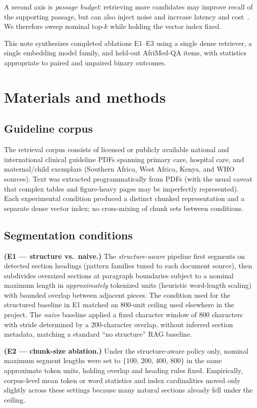 \documentclass[11pt,a4paper]{article}
\begin{document}
A second axis is \emph{passage budget}: retrieving more candidates may improve recall of the supporting passage, but can also inject noise and increase latency and cost~\cite{longcontextplaceholder}. We therefore sweep nominal top-\(k\) while holding the vector index fixed.

This note synthesizes completed ablations E1--E3 using a single dense retriever, a single embedding model family, and held-out AfriMed-QA items, with statistics appropriate to paired and unpaired binary outcomes.

\section{Materials and methods}

\subsection{Guideline corpus}
The retrieval corpus consists of licensed or publicly available national and international clinical guideline PDFs spanning primary care, hospital care, and maternal/child exemplars (Southern Africa, West Africa, Kenya, and WHO sources). Text was extracted programmatically from PDFs (with the usual caveat that complex tables and figure-heavy pages may be imperfectly represented). Each experimental condition produced a distinct chunked representation and a separate dense vector index; no cross-mixing of chunk sets between conditions.

\subsection{Segmentation conditions}
\textbf{(E1 --- structure vs.\ naive.)} The \emph{structure-aware} pipeline first segments on detected section headings (pattern families tuned to each document source), then subdivides oversized sections at paragraph boundaries subject to a nominal maximum length in \emph{approximately} tokenized units (heuristic word-length scaling) with bounded overlap between adjacent pieces. The condition used for the structured baseline in E1 matched an 800-unit ceiling used elsewhere in the project. The \emph{naive} baseline applied a fixed character window of 800 characters with stride determined by a 200-character overlap, without inferred section metadata, matching a standard ``no structure'' RAG baseline.

\textbf{(E2 --- chunk-size ablation.)} Under the structure-aware policy only, nominal maximum segment lengths were set to \(\{100,\,200,\,400,\,800\}\) in the same approximate token units, holding overlap and heading rules fixed. Empirically, corpus-level mean token or word statistics and index cardinalities moved only slightly across these settings because many natural sections already fell under the ceiling.
\end{document}
